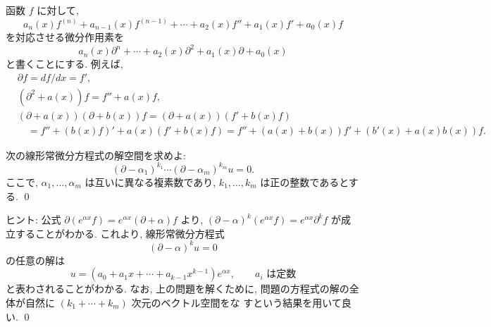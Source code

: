 \documentclass[12pt,twoside]{jarticle}
\begin{document}

\bigskip

函数 $f$ に対して, 
\begin{equation*}
  a_n(x)f^{(n)}+a_{n-1}(x)f^{(n-1)}+\cdots+a_2(x)f''+a_1(x)f'+a_0(x)f
\end{equation*}
を対応させる微分作用素を
\begin{equation*}
  a_n(x)\partial^n+\cdots+a_2(x)\partial^2+a_1(x)\partial+a_0(x)
\end{equation*}
と書くことにする. 例えば, 
\begin{align*}
  & \partial f = df/dx = f', \\
  & (\partial^2 + a(x)) f = f'' + a(x)f, \\
  & (\partial + a(x))(\partial + b(x))f = (\partial + a(x))(f'+b(x)f) \\
  & \quad
    = f'' +(b(x)f)' + a(x)(f'+b(x)f) 
    = f'' + (a(x)+b(x))f' + (b'(x) + a(x)b(x)) f.
\end{align*}

\begin{question}
  次の線形常微分方程式の解空間を求めよ:
  \begin{equation*}
    (\partial - \alpha_1)^{k_1} \cdots (\partial - \alpha_m)^{k_m} u = 0.
  \end{equation*}
  ここで, $\alpha_1,\ldots,\alpha_m$ は互いに異なる複素数であり, 
  $k_1,\ldots,k_m$ は正の整数であるとする.
  \qed
\end{question}

\noindent ヒント: 公式 %
\( %
  \partial (e^{\alpha x} f) = e^{\alpha x} (\partial + \alpha) f
\) %
より,
\( %
  (\partial - \alpha)^k(e^{\alpha x} f)
  = e^{\alpha x} \partial^k f
\) %
が成立することがわかる. これより, 線形常微分方程式
\begin{equation*}
  (\partial - \alpha)^k u = 0
  \tag{$*$}
\end{equation*}
の任意の解は
\begin{equation*}
  u = (a_0 + a_1 x + \cdots + a_{k-1} x^{k-1}) e^{\alpha x},
  \qquad
  \text{$a_i$ は定数}
\end{equation*}
と表わされることがわかる. なお, 上の問題を解くために, 
問題の方程式の解の全体が自然に $(k_1 + \cdots + k_m)$ 次元のベクトル空間をな
すという結果を用いて良い. 
\qed
\end{document}
